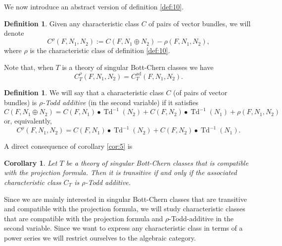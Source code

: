 \documentclass[10pt,twoside]{article}
\numberwithin{equation}{section}
\theoremstyle{plain}
\newtheorem{corollary}[equation]{Corollary}
\theoremstyle{definition}
\newtheorem{definition}[equation]{Definition}
\DeclareMathOperator{\Td}{Td}
\DeclareMathOperator{\ad}{ad}
\begin{document}
We now introduce an abstract version of definition \ref{def:10}.

\begin{definition}\label{def:15}
  Given any characteristic class $C$ of pairs of vector bundles, we will
  denote
  \begin{displaymath}
    C^{\rho}(F,N_{1},N_{2}):= C(F,N_{1}\oplus N_{2})-\rho (F,N_{1},N_{2}),
  \end{displaymath}
  where $\rho $ is the characteristic class of definition \ref{def:10}.  
\end{definition}
Note that, when $T$ is a theory of singular Bott-Chern classes we have
\begin{displaymath}
  C^{\rho}_{T}(F,N_{1},N_{2})=C^{\ad}_{T}(F,N_{1},N_{2}).
\end{displaymath}


\begin{definition} 
  We will say that a characteristic class $C$ (of pairs of vector bundles)
  is \emph{$\rho$-Todd additive} (in the second variable) if it satisfies
  \begin{equation*}
    C(F,N_{1}\oplus N_{2})=
     C(F,N_{1})\bullet \Td^{-1}(N_{2})+
     C(F,N_{2})\bullet \Td^{-1}(N_{1})+ \rho (F,N_{1},N_{2})
  \end{equation*}
or, equivalently, 
  \begin{equation*}
    C^{\rho}(F,N_{1}, N_{2})=
     C(F,N_{1})\bullet \Td^{-1}(N_{2})+
     C(F,N_{2})\bullet \Td^{-1}(N_{1}).
  \end{equation*}
\end{definition}

A direct consequence of corollary \ref{cor:5} is
\begin{corollary} \label{cor:6}
  Let $T$ be a theory of singular Bott-Chern classes that is
  compatible with the projection formula. Then it is transitive if and
  only if the associated characteristic class $C_{T}$ is $\rho $-Todd
  additive. 
\end{corollary}

Since we are mainly interested in singular Bott-Chern classes that are
transitive and compatible with the projection formula, we will
study characteristic classes that are compatible with the
  projection formula and $\rho $-Todd-additive in the second
  variable. Since we want to express any characteristic class in terms
  of a power series we will restrict ourselves to the algebraic category. 
\end{document}
